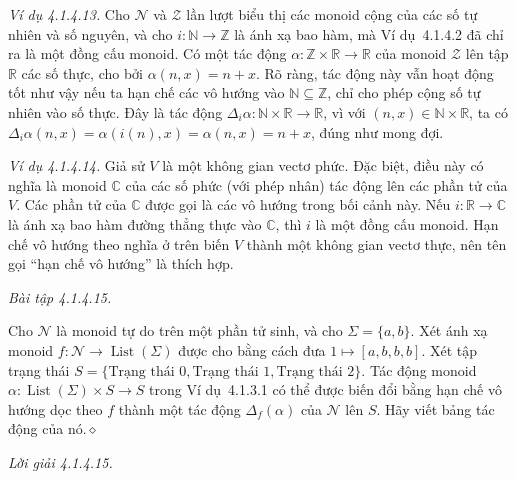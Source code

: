 \noindent\textit{Ví dụ 4.1.4.13.} Cho $\mathcal{N}$ và $\mathcal{Z}$ lần lượt biểu thị các monoid cộng của các số tự nhiên và số nguyên, và cho $i:\mathbb{N}\to\mathbb{Z}$ là ánh xạ bao hàm, mà Ví dụ~4.1.4.2 đã chỉ ra là một đồng cấu monoid. Có một tác động $\alpha:\mathbb{Z}\times\mathbb{R}\to\mathbb{R}$ của monoid $\mathcal{Z}$ lên tập $\mathbb{R}$ các số thực, cho bởi $\alpha(n,x)=n+x$. Rõ ràng, tác động này vẫn hoạt động tốt như vậy nếu ta hạn chế các vô hướng vào $\mathbb{N}\subseteq\mathbb{Z}$, chỉ cho phép cộng số tự nhiên vào số thực. Đây là tác động $\Delta_i\alpha:\mathbb{N}\times\mathbb{R}\to\mathbb{R}$, vì với $(n,x)\in\mathbb{N}\times\mathbb{R}$, ta có $\Delta_i\alpha(n,x)=\alpha(i(n),x)=\alpha(n,x)=n+x$, đúng như mong đợi.

\noindent\textit{Ví dụ 4.1.4.14.} Giả sử $V$ là một không gian vectơ phức. Đặc biệt, điều này có nghĩa là monoid $\mathbb{C}$ của các số phức (với phép nhân) tác động lên các phần tử của $V$. Các phần tử của $\mathbb{C}$ được gọi là các vô hướng trong bối cảnh này. Nếu $i:\mathbb{R}\to\mathbb{C}$ là ánh xạ bao hàm đường thẳng thực vào $\mathbb{C}$, thì $i$ là một đồng cấu monoid. Hạn chế vô hướng theo nghĩa ở trên biến $V$ thành một không gian vectơ thực, nên tên gọi ``hạn chế vô hướng'' là thích hợp.

\noindent\textit{Bài tập 4.1.4.15.}\keepwithnext

Cho $\mathcal{N}$ là monoid tự do trên một phần tử sinh, và cho $\Sigma=\{a,b\}$. Xét ánh xạ monoid $f:\mathcal{N}\to\operatorname{List}(\Sigma)$ được cho bằng cách đưa $1\mapsto[a,b,b,b]$. Xét tập trạng thái $S=\{\text{Trạng thái 0},\text{Trạng thái 1},\text{Trạng thái 2}\}$. Tác động monoid $\alpha:\operatorname{List}(\Sigma)\times S\to S$ trong Ví dụ~4.1.3.1 có thể được biến đổi bằng hạn chế vô hướng dọc theo $f$ thành một tác động $\Delta_f(\alpha)$ của $\mathcal{N}$ lên $S$. Hãy viết bảng tác động của nó.\hfill$\diamond$

\noindent\textit{Lời giải 4.1.4.15.}\keepwithnext

